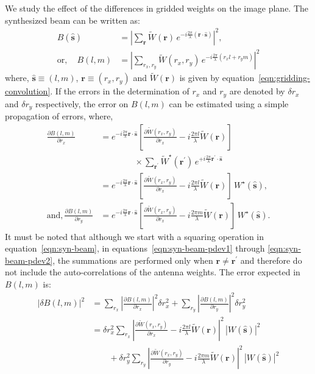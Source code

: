 \documentclass[a4paper,fleqn,usenatbib]{../mnras}
\begin{document}
We study the effect of the differences in gridded weights on the image plane. 
The synthesized beam can be written as:
\begin{align}\label{eqn:syn-beam}
  B(\hat{\mathbf{s}}) &= \left| \sum_\mathbf{r} \widetilde{W}(\mathbf{r})\,e^{-i\frac{2\pi}{\lambda}(\mathbf{r}\cdot\hat{\mathbf{s}})}\right|^2, \\
  \textrm{or}, \quad B(l,m) &= \left| \sum_{r_x,r_y} \widetilde{W}(r_x,r_y)\,e^{-i\frac{2\pi}{\lambda}(r_x l + r_y m)}\right|^2 
\end{align}
where, $\hat{\mathbf{s}}\equiv (l,m)$, $\mathbf{r}\equiv (r_x,r_y)$ and 
$\widetilde{W}(\mathbf{r})$ is given by equation~\ref{eqn:gridding-convolution}.
If the errors in the determination of $r_x$ and $r_y$ are denoted by 
$\delta r_x$ and $\delta r_y$ respectively, the error on $B(l,m)$ can be 
estimated using a simple propagation of errors, where,
\begin{align}
  \frac{\partial{B}(l,m)}{\partial{r_x}} &= e^{-i\frac{2\pi}{\lambda}\mathbf{r}\cdot\hat{\mathbf{s}}}\left[\frac{\partial{\widetilde{W}(r_x,r_y)}}{\partial{r_x}} - i\frac{2\pi l}{\lambda}\widetilde{W}(\mathbf{r})\right] \label{eqn:syn-beam-pdev1}\\
  &\qquad\qquad \times \sum_{\mathbf{r}^\prime} \widetilde{W}^\star(\mathbf{r}^\prime)\,e^{+i\frac{2\pi}{\lambda}\mathbf{r}^\prime\cdot \hat{\mathbf{s}}} \\
  &= e^{-i\frac{2\pi}{\lambda}\mathbf{r}\cdot\hat{\mathbf{s}}}\left[\frac{\partial{\widetilde{W}(r_x,r_y)}}{\partial{r_x}} - i\frac{2\pi l}{\lambda}\widetilde{W}(\mathbf{r})\right]\,W^\star(\hat{\mathbf{s}}), \\
  \textrm{and},\frac{\partial{B}(l,m)}{\partial{r_y}} &= e^{-i\frac{2\pi}{\lambda}\mathbf{r}\cdot\hat{\mathbf{s}}}\left[\frac{\partial{\widetilde{W}(r_x,r_y)}}{\partial{r_x}} - i\frac{2\pi m}{\lambda}\widetilde{W}(\mathbf{r})\right]\,W^\star(\hat{\mathbf{s}}). \label{eqn:syn-beam-pdev2}
\end{align}
It must be noted that although we start with a squaring operation in 
equation~\ref{eqn:syn-beam}, in equations~\ref{eqn:syn-beam-pdev1} through 
\ref{eqn:syn-beam-pdev2}, the summations are performed only when 
$\mathbf{r}\ne \mathbf{r}^\prime$ and therefore do not include the 
auto-correlations of the antenna weights. The error expected in $B(l,m)$ is:
\begin{align}
  \left|\delta B(l,m)\right|^2 &= \sum_{r_x}\left|\frac{\partial{B}(l,m)}{\partial{r_x}}\right|^2 \delta r_x^2 + \sum_{r_y}\left|\frac{\partial{B}(l,m)}{\partial{r_y}}\right|^2 \delta r_y^2 \\
  &= \delta r_x^2 \sum_{r_x}\left|\frac{\partial{\widetilde{W}(r_x,r_y)}}{\partial{r_x}} - i\frac{2\pi l}{\lambda}\widetilde{W}(\mathbf{r})\right|^2\,\left|W(\hat{\mathbf{s}})\right|^2 \nonumber\\
  &\qquad + \delta r_y^2 \sum_{r_y}\left|\frac{\partial{\widetilde{W}(r_x,r_y)}}{\partial{r_y}} - i\frac{2\pi m}{\lambda}\widetilde{W}(\mathbf{r})\right|^2\,\left|W(\hat{\mathbf{s}})\right|^2
\end{align}
\end{document}
